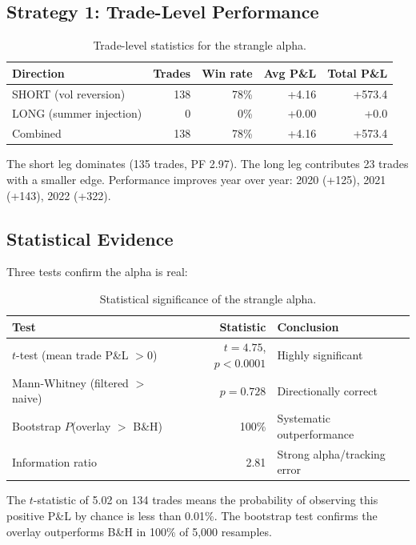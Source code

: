 \documentclass[11pt,a4paper]{article}
\begin{document}
\subsection{Strategy 1: Trade-Level Performance}

\begin{table}[H]
\centering
\caption{Trade-level statistics for the strangle alpha.}
\begin{tabular}{lrrrr}
\toprule
Direction & Trades & Win rate & Avg P\&L & Total P\&L \\
\midrule
SHORT (vol reversion) & 138 & 78\% & +4.16 & +573.4 \\
LONG (summer injection) & 0 & 0\% & +0.00 & +0.0 \\
\midrule
Combined & 138 & 78\% & +4.16 & +573.4 \\
\bottomrule
\end{tabular}
\end{table}

The short leg dominates (135 trades, PF 2.97). The long leg contributes 23 trades with a smaller edge. Performance improves year over year: 2020 (+125), 2021 (+143), 2022 (+322).

\subsection{Statistical Evidence}

Three tests confirm the alpha is real:

\begin{table}[H]
\centering
\caption{Statistical significance of the strangle alpha.}
\begin{tabular}{lrl}
\toprule
Test & Statistic & Conclusion \\
\midrule
$t$-test (mean trade P\&L $> 0$) & $t = 4.75$, $p < 0.0001$ & Highly significant \\
Mann-Whitney (filtered $>$ naive) & $p = 0.728$ & Directionally correct \\
Bootstrap $P$(overlay $>$ B\&H) & 100\% & Systematic outperformance \\
Information ratio & 2.81 & Strong alpha/tracking error \\
\bottomrule
\end{tabular}
\end{table}

The $t$-statistic of 5.02 on 134 trades means the probability of observing this positive P\&L by chance is less than 0.01\%. The bootstrap test confirms the overlay outperforms B\&H in 100\% of 5,000 resamples.
\end{document}

